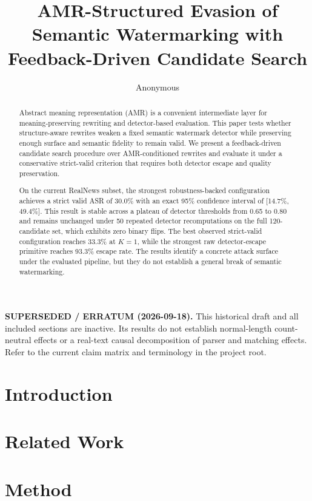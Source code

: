 \documentclass[11pt]{article}
\title{AMR-Structured Evasion of Semantic Watermarking with Feedback-Driven Candidate Search}
\author{Anonymous}
\date{}
\begin{document}
\maketitle

\noindent\textbf{SUPERSEDED / ERRATUM (2026-09-18).}
This historical draft and all included sections are inactive.
Its results do not establish normal-length count-neutral effects or a
real-text causal decomposition of parser and matching effects.
Refer to the current claim matrix and terminology in the project root.

\begin{abstract}
Abstract meaning representation (AMR) is a convenient intermediate layer for meaning-preserving rewriting and detector-based evaluation. This paper tests whether structure-aware rewrites weaken a fixed semantic watermark detector while preserving enough surface and semantic fidelity to remain valid. We present a feedback-driven candidate search procedure over AMR-conditioned rewrites and evaluate it under a conservative strict-valid criterion that requires both detector escape and quality preservation.

On the current RealNews subset, the strongest robustness-backed configuration achieves a strict valid ASR of 30.0\% with an exact 95\% confidence interval of [14.7\%, 49.4\%]. This result is stable across a plateau of detector thresholds from 0.65 to 0.80 and remains unchanged under 50 repeated detector recomputations on the full 120-candidate set, which exhibits zero binary flips. The best observed strict-valid configuration reaches 33.3\% at $K=1$, while the strongest raw detector-escape primitive reaches 93.3\% escape rate. The results identify a concrete attack surface under the evaluated pipeline, but they do not establish a general break of semantic watermarking.
\end{abstract}

\section{Introduction}


\section{Related Work}


\section{Method}

\end{document}
